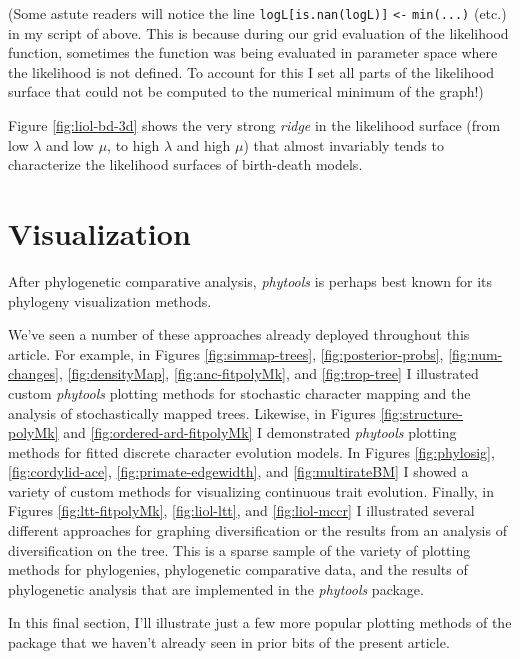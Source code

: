 \documentclass[fleqn,10pt,lineno]{wlpeerj} %
\begin{document}
(Some astute readers will notice the line \texttt{logL{[}is.nan(logL){]}} \texttt{\textless{}-} \texttt{min(...)} (etc.) in my script of above. This is because during our grid evaluation of the likelihood function, sometimes the function was being evaluated in parameter space where the likelihood is not defined. To account for this I set all parts of the likelihood surface that could not be computed to the numerical minimum of the graph!)

Figure \ref{fig:liol-bd-3d} shows the very strong \emph{ridge} in the likelihood surface (from low \(\lambda\) and low \(\mu\), to high \(\lambda\) and high \(\mu\)) that almost invariably tends to characterize the likelihood surfaces of birth-death models.

\hypertarget{visualization}{%
\section{Visualization}\label{visualization}}

After phylogenetic comparative analysis, \emph{phytools} is perhaps best known for its phylogeny visualization methods.

We've seen a number of these approaches already deployed throughout this article. For example, in Figures \ref{fig:simmap-trees}, \ref{fig:posterior-probs}, \ref{fig:num-changes}, \ref{fig:densityMap}, \ref{fig:anc-fitpolyMk}, and \ref{fig:trop-tree} I illustrated custom \emph{phytools} plotting methods for stochastic character mapping and the analysis of stochastically mapped trees. Likewise, in Figures \ref{fig:structure-polyMk} and \ref{fig:ordered-ard-fitpolyMk} I demonstrated \emph{phytools} plotting methods for fitted discrete character evolution models. In Figures \ref{fig:phylosig}, \ref{fig:cordylid-ace}, \ref{fig:primate-edgewidth}, and \ref{fig:multirateBM} I showed a variety of custom methods for visualizing continuous trait evolution. Finally, in Figures \ref{fig:ltt-fitpolyMk}, \ref{fig:liol-ltt}, and \ref{fig:liol-mccr} I illustrated several different approaches for graphing diversification or the results from an analysis of diversification on the tree. This is a sparse sample of the variety of plotting methods for phylogenies, phylogenetic comparative data, and the results of phylogenetic analysis that are implemented in the \emph{phytools} package.

In this final section, I'll illustrate just a few more popular plotting methods of the package that we haven't already seen in prior bits of the present article.
\end{document}

